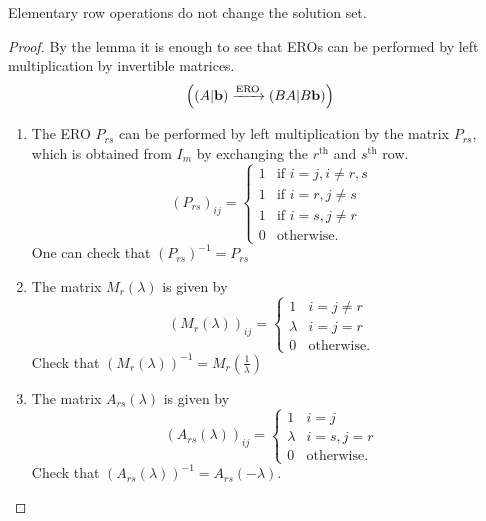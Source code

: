 \documentclass[10pt, a4paper]{article}
\begin{document}
\begin{proposition}
    Elementary row operations do not change the solution set.
    \begin{proof}
        By the lemma it is enough to see that EROs can be performed by left multiplication by invertible matrices.
        \[
        \left((A | \mathbf{b}) \xrightarrow{\text{ERO}} (BA | B\mathbf{b})\right)
        \]
        \begin{enumerate}[label = (\roman*)]
            \item The ERO $P_{rs}$ can be performed by left multiplication by the matrix $P_{rs}$,
            which is obtained from $I_m$ by exchanging the $r^{\text{th}}$ and $s^{\text{th}}$ row.
            \[
            (P_{rs})_{ij} = \begin{cases}
                1 &\text{if } i = j, i \neq r, s \\
                1 &\text{if } i = r, j \neq s \\
                1 &\text{if } i = s, j \neq r \\
                0 &\text{otherwise}.
            \end{cases}
            \]
            One can check that
            $(P_{rs}) ^ {-1} = P_{rs}$
            \item The matrix $M_r(\lambda)$ is given by
            \[
            (M_r(\lambda))_{ij} = \begin{cases}
                1 &i = j \neq r \\
                \lambda &i = j = r \\
                0 &\text{otherwise}.
            \end{cases}
            \]
            Check that
            $(M_r(\lambda)) ^ {-1} = M_r\left(\frac{1}{\lambda}\right)$
            \item The matrix $A_{rs}(\lambda)$ is given by
            \[
            (A_{rs}(\lambda))_{ij} = \begin{cases}
                1 &i = j \\
                \lambda &i = s, j = r \\
                0 &\text{otherwise}.
            \end{cases}
            \]
            Check that $(A_{rs}(\lambda)) ^ {-1} = A_{rs}(-\lambda)$.
        \end{enumerate}
    \end{proof}
\end{proposition}
\end{document}
